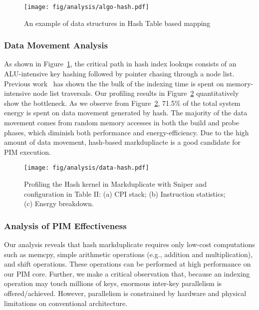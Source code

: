 \begin{figure}[htbp]
\centering
\texttt{[image: fig/analysis/algo-hash.pdf]}
\caption{An example of data structures in Hash Table based mapping}
\label{fig:algo-hash}
\end{figure}

\subsubsection{Data Movement Analysis}
As shown in Figure~\ref{fig:algo-hash}, the critical path in hash index lookups consists of an ALU-intensive key hashing followed by pointer chasing through a node list. Previous work~\cite{yuanrong} has shown the the bulk of the indexing time is spent on memory-intensive node list traversals. Our profiling results in Figure~\ref{fig:data-hash} quantitatively show the bottleneck. As we observe from Figure~\ref{fig:data-hash}, 71.5\% of the total system energy is spent on data movement generated by hash. The majority of the data movement comes from random memory accesses in both the build and probe phases, which diminish both performance and energy-efficiency. Due to the high amount of data movement, hash-based markdupliacte is a good candidate for PIM execution.
\begin{figure}[htbp]
\centering
\texttt{[image: fig/analysis/data-hash.pdf]}
\caption{Profiling the Hash kernel in Markduplicate with Sniper and configuration in Table II: (a) CPI stack; (b) Instruction statistics; (c) Energy breakdown.}
\label{fig:data-hash}
\end{figure}

\subsubsection{Analysis of PIM Effectiveness}
Our analysis reveals that hash markduplicate requires only low-cost computations such as memcpy, simple arithmetic operations (e.g., addition and multiplication), and shift operations. These operations can be performed at high performance on our PIM core. Further, we make a critical observation that, because an indexing operation may touch millions of keys, enormous inter-key parallelism is offered/achieved. However, parallelism is constrained by hardware and physical limitations on conventional architecture.


